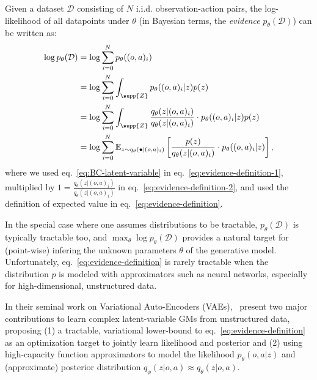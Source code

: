 Given a dataset \( \mathcal D \) consisting of \( N \) i.i.d. observation-action pairs, the log-likelihood of all datapoints under \( \theta \) (in Bayesian terms, the \emph{evidence} \( p_\theta(\mathcal D)\)) can be written as:
\begin{align}
    \log p_\theta(\mathcal D) &= \log \sum_{i=0}^N p_\theta ((o,a)_i) \label{eq:evidence-definition-1}\\
                              &= \log \sum_{i=0}^N \int_{\supp{Z}} p_\theta((o,a)_i \vert z) p(z) \label{eq:evidence-definition-2}\\
                              &= \log \sum_{i=0}^N \int_{\supp{Z}} \frac{q_\theta(z \vert (o,a)_i)}{q_\theta(z \vert (o,a)_i)} \cdot p_\theta((o,a)_i \vert z) p(z) \label{eq:evidence-definition-3}\\
                              &= \log \sum_{i=0}^N \mathbb E_{z \sim q_\theta(\bullet \vert (o,a)_i)} \left[ \frac{p(z)}{q_\theta(z \vert (o,a)_i)} \cdot p_\theta((o,a)_i \vert z) \right], \label{eq:evidence-definition}
\end{align}
where we used eq.~\ref{eq:BC-latent-variable} in eq.~\ref{eq:evidence-definition-1}, multiplied by \(1 = \frac{q_\theta(z \vert (o,a)_i)}{q_\theta(z \vert (o,a)_i)} \) in eq.~\ref{eq:evidence-definition-2}, and used the definition of expected value in eq.~\ref{eq:evidence-definition}.

In the special case where one assumes distributions to be tractable, \( p_\theta (\mathcal D) \) is typically tractable too, and \(\max_\theta \log p_\theta(\mathcal D) \) provides a natural target for (point-wise) infering the unknown parameters \( \theta \) of the generative model.
Unfortunately, eq.~\ref{eq:evidence-definition} is rarely tractable when the distribution \( p \) is modeled with approximators such as neural networks, especially for high-dimensional, unstructured data.

In their seminal work on Variational Auto-Encoders (VAEs),~\citet{kingmaAutoEncodingVariationalBayes2022} present two major contributions to learn complex latent-variable GMs from unstructured data, proposing (1) a tractable, variational lower-bound to eq.~\ref{eq:evidence-definition} as an optimization target to jointly learn likelihood and posterior and (2) using high-capacity function approximators to model the likelihood \(p_\theta(o,a\vert z)\) and (approximate) posterior distribution \( q_\phi(z \vert o,a) \approx q_\theta(z \vert o,a) \).

